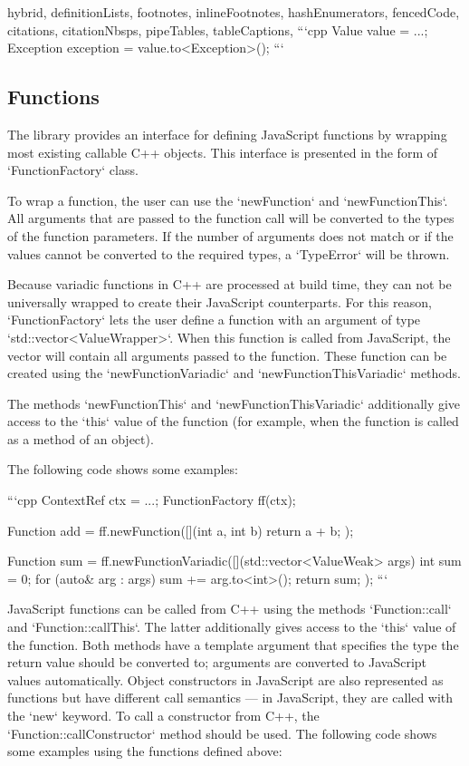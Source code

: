 \begin{markdown*}{%
  hybrid,
  definitionLists,
  footnotes,
  inlineFootnotes,
  hashEnumerators,
  fencedCode,
  citations,
  citationNbsps,
  pipeTables,
  tableCaptions,
}
```cpp
Value value = ...;
Exception exception = value.to<Exception>();
```

\subsection{Functions}

The library provides an interface for defining JavaScript functions by wrapping most existing callable C++ objects. This interface is presented in the form of `FunctionFactory` class.

To wrap a function, the user can use the `newFunction` and `newFunctionThis`. All arguments that are passed to the function call will be converted to the types of the function parameters. If the number of arguments does not match or if the values cannot be converted to the required types, a `TypeError` will be thrown.

Because variadic functions in C++ are processed at build time, they can not be universally wrapped to create their JavaScript counterparts. For this reason, `FunctionFactory` lets the user define a function with an argument of type `std::vector<ValueWrapper>`. When this function is called from JavaScript, the vector will contain all arguments passed to the function. These function can be created using the `newFunctionVariadic` and `newFunctionThisVariadic` methods.

The methods `newFunctionThis` and `newFunctionThisVariadic` additionally give access to the `this` value of the function (for example, when the function is called as a method of an object).

The following code shows some examples:

```cpp
ContextRef ctx = ...;
FunctionFactory ff(ctx);

Function add = ff.newFunction([](int a, int b) { return a + b; });

Function sum = ff.newFunctionVariadic([](std::vector<ValueWeak> args) {
  int sum = 0;
  for (auto& arg : args) {
    sum += arg.to<int>();
  }
  return sum;
});
```

JavaScript functions can be called from C++ using the methods `Function::call` and `Function::callThis`. The latter additionally gives access to the `this` value of the function. Both methods have a template argument that specifies the type the return value should be converted to; arguments are converted to JavaScript values automatically. Object constructors in JavaScript are also represented as functions but have different call semantics --- in JavaScript, they are called with the `new` keyword. To call a constructor from C++, the `Function::callConstructor` method should be used. The following code shows some examples using the functions defined above:


\end{markdown*}
